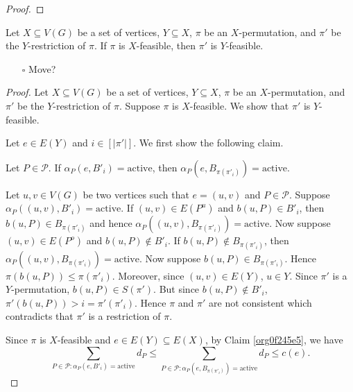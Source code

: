 \documentclass[fontsize=11pt,paper=a4]{book}
\begin{document}
\begin{proof}
\end{proof}

\begin{lem}
Let \(X\subseteq V(G)\) be a set of vertices, \(Y\subseteq X\), \(\pi\) be an \(X\)-permutation, and \(\pi'\) be the \(Y\)-restriction of \(\pi\).
If \(\pi\) is \(X\)-feasible, then \(\pi'\) is \(Y\)-feasible.
\label{orgc13b2e5}
\end{lem}

\begin{itemize}
\item[{$\square$}] Move?
\end{itemize}

\begin{proof}
Let \(X\subseteq V(G)\) be a set of vertices, \(Y\subseteq X\), \(\pi\) be an \(X\)-permutation, and \(\pi'\) be the \(Y\)-restriction of \(\pi\).
Suppose \(\pi\) is \(X\)-feasible.
We show that \(\pi'\) is \(Y\)-feasible.

Let \(e\in E(Y)\) and \(i\in[\lvert\pi'\rvert]\).
We first show the following claim.

\begin{claim}
Let \(P\in\mathcal{P}\).
If \(\alpha_P(e,B'_i)=\mathrm{active}\), then \(\alpha_P(e,B_{\pi(\pi'_i)})=\mathrm{active}\).
\label{org0f245e5}
\end{claim}

\begin{proof2}
Let \(u,v\in V(G)\) be two vertices such that \(e=(u,v)\) and \(P\in\mathcal{P}\).
Suppose \(\alpha_P((u,v),B'_i)=\mathrm{active}\).
If \((u,v)\in E(P^u)\) and \(b(u,P)\in B'_i\), then \(b(u,P)\in B_{\pi(\pi'_i)}\) and hence \(\alpha_P((u,v),B_{\pi(\pi'_i)})=\mathrm{active}\).
Now suppose \((u,v)\in E(P^o)\) and \(b(u,P)\notin B'_i\).
If \(b(u,P)\notin B_{\pi(\pi'_i)}\), then \(\alpha_P((u,v),B_{\pi(\pi'_i)})=\mathrm{active}\).
Now suppose \(b(u,P)\in B_{\pi(\pi'_i)}\).
Hence \(\pi(b(u,P))\leq \pi(\pi'_i)\).
Moreover, since \((u,v)\in E(Y)\), \(u\in Y\).
Since \(\pi'\) is a \(Y\)-permutation, \(b(u,P)\in S(\pi')\).
But since \(b(u,P)\notin B'_i\), \(\pi'(b(u,P))>i=\pi'(\pi'_i)\).
Hence \(\pi\) and \(\pi'\) are not consistent which contradicts that \(\pi'\) is a restriction of \(\pi\).
\end{proof2}

Since \(\pi\) is \(X\)-feasible and \(e\in E(Y)\subseteq E(X)\), by Claim \ref{org0f245e5}, we have
\[
\sum_{P\in\mathcal{P}:\alpha_P(e,B'_i)=\mathrm{active}}d_P\leq\sum_{P\in\mathcal{P}:\alpha_P(e,B_{\pi(\pi'_i)})=\mathrm{active}}d_P\leq c(e).
\]
\end{proof}
\end{document}
